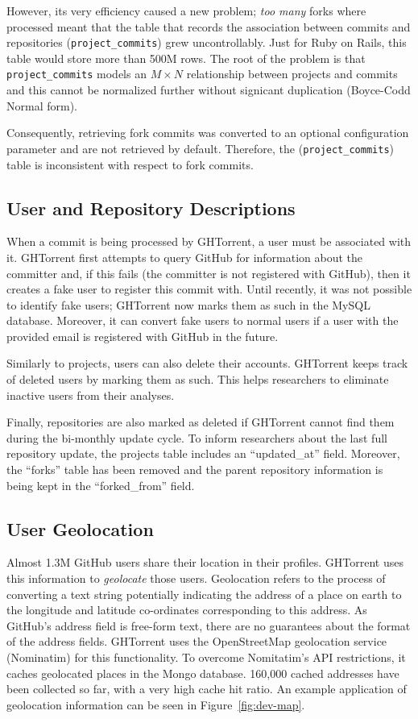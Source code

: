\documentclass{sig-alternate}
\begin{document}
However, its very efficiency caused a new problem; \emph{too many} forks where
processed meant that the table that records the association between commits and
repositories (\texttt{project\_\-commits}) grew uncontrollably. Just for Ruby on
Rails, this table would store more than 500M rows. The root of the problem
is that \texttt{project\_commits} models an $M \times N$ relationship between
projects and commits and this cannot be normalized further without signicant
duplication (Boyce-Codd Normal form).

Consequently, retrieving fork commits was converted to an optional
configuration parameter and are not retrieved by default. Therefore, the
(\texttt{project\_\-commits}) table is inconsistent with respect to
fork commits.

\subsection{User and Repository Descriptions}

When a commit is being processed by GHTorrent, a user must be associated with it.
GHTorrent first attempts to query GitHub for information about the committer
and, if this fails (the committer is not registered with GitHub), then it
creates a fake user to register this commit with. Until recently, it was not
possible to identify fake users; GHTorrent now marks them as such in the MySQL
database. Moreover, it can convert fake users to normal users if a user with
the provided email is registered with GitHub in the future.

Similarly to projects, users can also delete their accounts.
GHTorrent keeps track of deleted users by marking them as such. This helps
researchers to eliminate inactive users from their analyses.

Finally, repositories are also marked as deleted if GHTorrent cannot find
them during the bi-monthly update cycle. To inform researchers about the
last full repository update, the projects table includes an ``updated\_at''
field. Moreover, the ``forks'' table has been removed and the parent
repository information is being kept in the ``forked\_\-from'' field.

\subsection{User Geolocation}

Almost 1.3M GitHub users share their location in their profiles. GHTorrent uses
this information to \emph{geolocate} those users. Geolocation refers to the
process of converting a text string potentially indicating the address of a
place on earth to the longitude and latitude co-ordinates corresponding to this
address. As GitHub's address field is free-form text, there are no guarantees
about the format of the address fields. GHTorrent uses the OpenStreetMap
geolocation service (Nominatim) for this functionality. To overcome Nomitatim's
API restrictions, it caches geolocated places in the Mongo database. 160,000
cached addresses have been collected so far, with a very high cache hit ratio.
An example application of geolocation information can be seen in
Figure~\ref{fig:dev-map}.
\end{document}
